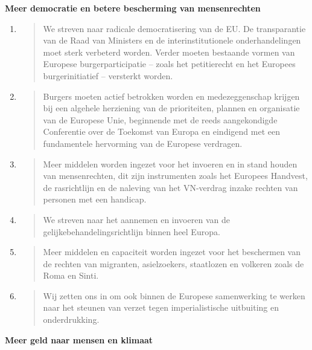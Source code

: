 \textbf{Meer democratie en betere bescherming van mensenrechten}

\begin{enumerate}
\def\labelenumi{\arabic{enumi}.}
\item
  \begin{quote}
  We streven naar radicale democratisering van de EU. De transparantie
  van de Raad van Ministers en de interinstitutionele onderhandelingen
  moet sterk verbeterd worden. Verder moeten bestaande vormen van
  Europese burgerparticipatie -- zoals het petitierecht en het Europees
  burgerinitiatief -- versterkt worden.
  \end{quote}
\item
  \begin{quote}
  Burgers moeten actief betrokken worden en medezeggenschap krijgen bij
  een algehele herziening van de prioriteiten, plannen en organisatie
  van de Europese Unie, beginnende met de reeds aangekondigde
  Conferentie over de Toekomst van Europa en eindigend met een
  fundamentele hervorming van de Europese verdragen.
  \end{quote}
\item
  \begin{quote}
  Meer middelen worden ingezet voor het invoeren en in stand houden van
  mensenrechten, dit zijn instrumenten zoals het Europees Handvest, de
  rasrichtlijn en de naleving van het VN-verdrag inzake rechten van
  personen met een handicap.
  \end{quote}
\item
  \begin{quote}
  We streven naar het aannemen en invoeren van de
  gelijkebehandelingsrichtlijn binnen heel Europa.
  \end{quote}
\item
  \begin{quote}
  Meer middelen en capaciteit worden ingezet voor het beschermen van de
  rechten van migranten, asielzoekers, staatlozen en volkeren zoals de
  Roma en Sinti.
  \end{quote}
\item
  \begin{quote}
  Wij zetten ons in om ook binnen de Europese samenwerking te werken
  naar het steunen van verzet tegen imperialistische uitbuiting en
  onderdrukking.
  \end{quote}
\end{enumerate}

\textbf{Meer geld naar mensen en klimaat}

